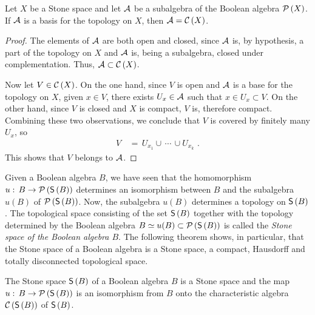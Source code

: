 \begin{lemmaCharAlg}\label{thm:charalg}
	Let $X$ be a Stone space and let $\cal{A}$ be a subalgebra of the
	Boolean algebra $\powset{X}$. If $\cal{A}$ is a basis for the topology
	on $X$, then $\cal{A}=\charalg{X}$.
\end{lemmaCharAlg}

\begin{proof}
	The elements of $\cal{A}$ are both open and closed, since
	$\cal{A}$ is, by hypothesis, a part of the topology on $X$ and
	$\cal{A}$ is, being a subalgebra, closed under complementation.
	Thus, $\cal{A}\subset\charalg{X}$.

	Now let $V\in\charalg{X}$. On the one hand, since $V$ is open and
	$\cal{A}$ is a base for the topology on $X$, given $x\in V$, there
	exists $U_{x}\in\cal{A}$ such that $x\in U_{x}\subset V$. On the
	other hand, since $V$ is closed and $X$ is compact, $V$ is,
	therefore compact. Combining these two observations, we conclude
	that $V$ is covered by finitely many $U_{x}$, so
	\begin{align*}
		V & \,=\, U_{x_{1}}\cup\,\cdots\,\cup U_{x_{k}}
		\text{ .}
	\end{align*}
	This shows that $V$ belongs to $\cal{A}$.
\end{proof}

Given a Boolean algebra $B$, we have seen that the homomorphism
$u:\,B\rightarrow\powset{\ufilters{B}}$ determines an isomorphism between
$B$ and the subalgebra $u(B)$ of $\powset{\ufilters{B}}$. Now, the subalgebra
$u(B)$ determines a topology on $\ufilters{B}$. The topological space
consisting of the set $\ufilters{B}$ together with the topology determined
by the Boolean algebra $B\simeq u(B)\subset\powset{\ufilters{B}}$ is called
the \emph{Stone space of the Boolean algebra $B$}. The following theorem
shows, in particular, that the Stone space of a Boolean algebra is a Stone
space, a compact, Hausdorff and totally disconnected topological space.

\begin{thmStoneSpaceOfBoolIsStoneSpace}\label{thm:stoneofboolisstone}
	The Stone space $\ufilters{B}$ of a Boolean algebra $B$ is a
	Stone space and the map $u:\,B\rightarrow\powset{\ufilters{B}}$
	is an isomorphism from $B$ onto the characteristic algebra
	$\charalg{\ufilters{B}}$ of $\ufilters{B}$.
\end{thmStoneSpaceOfBoolIsStoneSpace}

